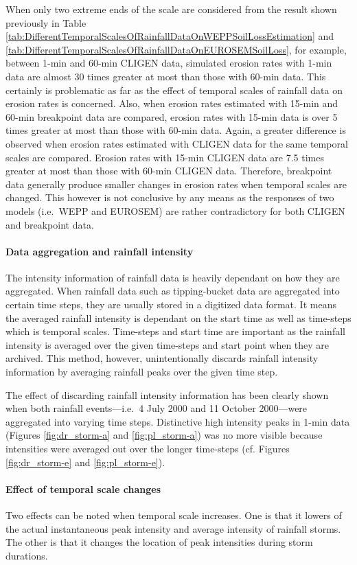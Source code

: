 When only two extreme ends of the scale are considered from the result shown
previously in Table
\ref{tab:DifferentTemporalScalesOfRainfallDataOnWEPPSoilLossEstimation} and
\ref{tab:DifferentTemporalScalesOfRainfallDataOnEUROSEMSoilLoss}, for example,
between 1-min and 60-min CLIGEN data, simulated erosion rates with 1-min data
are almost 30 times greater at most than those with 60-min data. This certainly
is problematic as far as the effect of temporal scales of rainfall data on
erosion rates is concerned. Also, when erosion rates estimated with 15-min and
60-min breakpoint data are compared, erosion rates with 15-min data is over 5
times greater at most than those with 60-min data. Again, a greater difference
is observed when erosion rates estimated with CLIGEN data for the same temporal
scales are compared. Erosion rates with 15-min CLIGEN data are 7.5 times greater
at most than those with 60-min CLIGEN data. Therefore, breakpoint data generally
produce smaller changes in erosion rates when temporal scales are changed. This
however is not conclusive by any means as the responses of two models (i.e.\
WEPP and EUROSEM) are rather contradictory for both CLIGEN and breakpoint data.

\paragraph{Data aggregation and rainfall intensity} The intensity information
of rainfall data is heavily dependant on how they are aggregated. When rainfall
data such as tipping-bucket data are aggregated into certain time steps, they
are usually stored in a digitized data format. It means the averaged rainfall
intensity is dependant on the start time as well as time-steps which is temporal
scales. Time-steps and start time are important as the rainfall intensity is
averaged over the given time-steps and start point when they are archived. This
method, however, unintentionally discards rainfall intensity information by
averaging rainfall peaks over the given time step.

The effect of discarding rainfall intensity information has been clearly shown
when both rainfall events---i.e.\ 4 July 2000 and 11 October 2000---were
aggregated into varying time steps. Distinctive high intensity peaks in 1-min
data (Figures \ref{fig:dr_storm-a} and \ref{fig:pl_storm-a}) was no more visible
because intensities were averaged out over the longer time-steps (cf. Figures
\ref{fig:dr_storm-e} and \ref{fig:pl_storm-e}).

\paragraph{Effect of temporal scale changes} Two effects can be noted when
temporal scale increases. One is that it lowers of the actual instantaneous peak
intensity and average intensity of rainfall storms. The other is that it
changes the location of peak intensities during storm durations.

